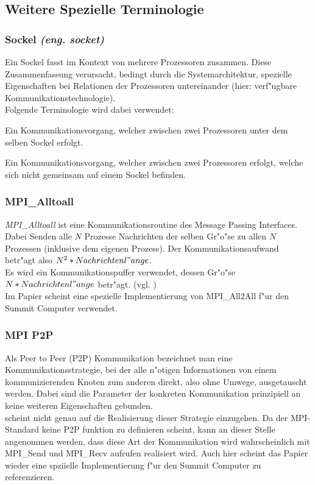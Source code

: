 \subsection{Weitere Spezielle Terminologie}
\subsubsection{Sockel \textit{(eng. socket)}}
Ein Sockel fasst im Kontext von \cite{mainpaper} mehrere Prozessoren zusammen. Diese Zusammenfassung verursacht, bedingt durch die Systemarchitektur, spezielle Eigenschaften bei Relationen der Prozessoren untereinander (hier: verf"ugbare Kommunikationstechnologie).\\
Folgende Terminologie wird dabei verwendet:
\begin{defi}
Ein Kommunikationsvorgang, welcher zwischen zwei Prozessoren unter dem selben Sockel erfolgt.
\end{defi}
\begin{defi}
Ein Kommunikationsvorgang, welcher zwischen zwei Prozessoren erfolgt, welche sich nicht gemeinsam auf einem Sockel befinden.
\end{defi}

\subsubsection{MPI\_Alltoall}
\textit{MPI\_Alltoall} ist eine Kommunikationsroutine des Message Passing Interfaces. Dabei Senden alle $N$ Prozesse Nachrichten der selben Gr"o"se zu allen $N$ Prozessen (inklusive dem eigenen Prozess). Der Kommunikationsaufwand betr"agt also $N^2 * Nachrichtenl"ange$.\\
Es wird ein Kommunikationspuffer verwendet, dessen Gr"o"se $N*Nachrichtenl"ange$ betr"agt. (vgl. \cite{MPImanpage})\\
Im Papier \cite{mainpaper} scheint eine spezielle Implementierung von MPI\_All2All f"ur den Summit Computer verwendet.

\subsubsection{MPI P2P}
Als Peer to Peer (P2P) Kommunikation bezeichnet man eine Kommunikationsstrategie, bei der alle n"otigen Informationen von einem kommunizierenden Knoten zum anderen direkt, also ohne Umwege, ausgetauscht werden. Dabei sind die Parameter der konkreten Kommunikation prinzipiell an keine weiteren Eigenschaften gebunden.\\
\cite{mainpaper} scheint nicht genau auf die Realisierung dieser Strategie einzugehen. Da der MPI-Standard keine P2P funktion zu definieren scheint, kann an dieser Stelle angenommen werden, dass diese Art der Kommunikation wird wahrscheinlich mit MPI\_Send und MPI\_Recv aufrufen realisiert wird.
Auch hier scheint das Papier \cite{mainpaper} wieder eine spziielle Implementierung f"ur den Summit Computer zu referenzieren.

